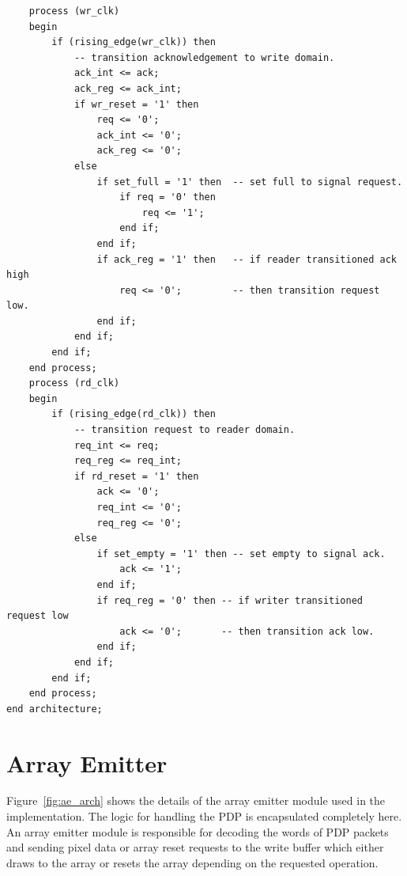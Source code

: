 \begin{verbatim}
    process (wr_clk)
    begin
        if (rising_edge(wr_clk)) then
            -- transition acknowledgement to write domain.
            ack_int <= ack;
            ack_reg <= ack_int;
            if wr_reset = '1' then
                req <= '0';
                ack_int <= '0';
                ack_reg <= '0';
            else
                if set_full = '1' then  -- set full to signal request.
                    if req = '0' then
                        req <= '1';
                    end if;
                end if;
                if ack_reg = '1' then   -- if reader transitioned ack high
                    req <= '0';         -- then transition request low.
                end if;
            end if;
        end if;
    end process;
    process (rd_clk)
    begin
        if (rising_edge(rd_clk)) then
            -- transition request to reader domain.
            req_int <= req;
            req_reg <= req_int;
            if rd_reset = '1' then
                ack <= '0';
                req_int <= '0';
                req_reg <= '0';
            else
                if set_empty = '1' then -- set empty to signal ack.
                    ack <= '1';
                end if;
                if req_reg = '0' then -- if writer transitioned request low
                    ack <= '0';       -- then transition ack low.
                end if;
            end if;
        end if;
    end process;
end architecture;
        \end{verbatim}

\section{Array Emitter}

    Figure~\ref{fig:ae_arch} shows the details of the array emitter module used in the implementation. The logic for handling the PDP is encapsulated completely here. An array emitter module is responsible for decoding the words of PDP packets and sending pixel data or array reset requests to the write buffer which either draws to the array or resets the array depending on the requested operation.

